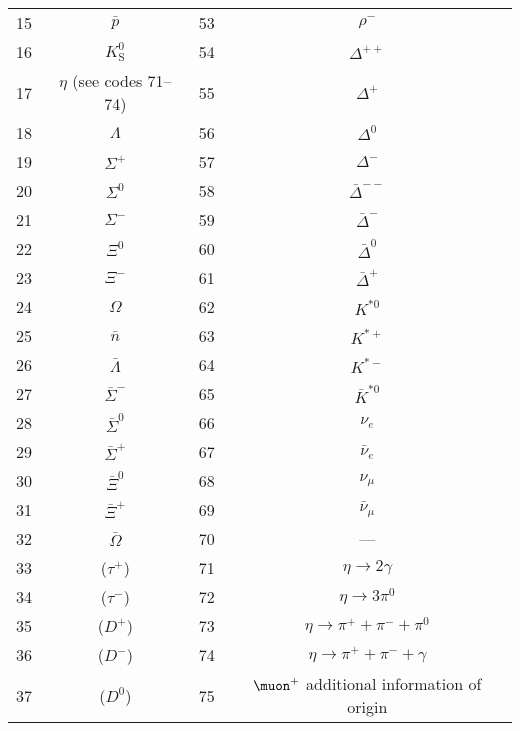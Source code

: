{\begin{table}[htb]
\begin{center}
\begin{tabular}{rc|rc}
       15 & $\bar{p}$ &                              53 & $\rho^-$ \\
       16 & $K^0_{\text{S}}$ &                       54 & $\Delta^{++}$ \\
       17 & $\eta$ (see codes 71--74) &              55 & $\Delta^+$ \\
       18 & $\Lambda$ &                              56 & $\Delta^0$ \\
       19 & $\Sigma^+$ &                             57 & $\Delta^-$ \\
       20 & $\Sigma^0$ &                             58 & $\bar{\Delta}^{--}$ \\
       21 & $\Sigma^-$ &                             59 & $\bar{\Delta}^-$ \\
       22 & $\Xi^0$ &                                60 & $\bar{\Delta}^0$ \\
       23 & $\Xi^-$ &                                61 & $\bar{\Delta}^+$ \\
       24 & $\Omega$ &                               62 & $K^{*0}$ \\
       25 & $\bar{n}$ &                              63 & $K^{*+}$ \\
       26 & $\bar{\Lambda}$ &                        64 & $K^{*-}$ \\
       27 & $\bar{\Sigma}^-$ &                       65 & $\bar{K}^{*0}$ \\
       28 & $\bar{\Sigma}^0$ &                       66 & $\nu_e$   \\
       29 & $\bar{\Sigma}^+$ &                       67 & $\bar{\nu}_e$ \\
       30 & $\bar{\Xi}^0$ &                          68 & $\nu_\mu$ \\
       31 & $\bar{\Xi}^+$ &                          69 & $\bar{\nu}_\mu$ \\
       32 & $\bar{\Omega}$ &                         70 & --- \\
       33 & ($\tau^+$) &                             71 & $\eta \longrightarrow 2 \gamma$ \\
       34 & ($\tau^-$) &                             72 & $\eta \longrightarrow 3 \pi^0$ \\
       35 & ($D^+$) &                                73 & $\eta \longrightarrow \pi^+ + \pi^- + \pi^0$ \\
       36 & ($D^-$) &                                74 & $\eta \longrightarrow \pi^+ + \pi^- + \gamma$ \\
       37 & ($D^0$) &                                75 & $\muon^+$  additional information of origin \\

\end{tabular}
\end{center}
\end{table}}
